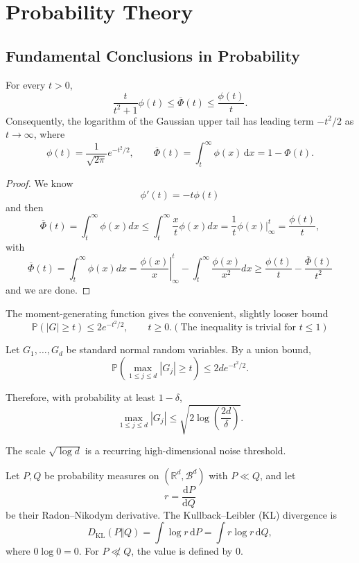 \section{Probability Theory}

\subsection{Fundamental Conclusions in Probability}

\begin{proposition}
For every $t>0$,
\[
\frac{t}{t^2+1}\phi(t)
\leq
\overline{\Phi}(t)
\leq
\frac{\phi(t)}{t}.
\]
Consequently, the logarithm of the Gaussian upper tail has leading term
$-t^2/2$ as $t\to\infty$, where
\[
\phi(t)=\frac{1}{\sqrt{2\pi}}e^{-t^2/2},
\qquad
\overline{\Phi}(t)
=\int_t^\infty \phi(x)\,\mathrm{d}x
=1-\Phi(t).
\]
\end{proposition}
\begin{proof}
    We know
    \[
    \phi'(t) = -t\phi(t)
    \]
    and then
    \[
    \overline{\Phi}(t) = \int_t^{\infty}\phi(x)dx \leq \int_t^{\infty} \dfrac{x}{t}\phi(x)dx = \dfrac{1}{t}\phi(x)|_{\infty}^{t} = \dfrac{\phi(t)}{t}, 
    \]
    with
    \[
     \overline{\Phi}(t) = \int_t^{\infty} \phi(x)dx  = \left.\dfrac{\phi(x)}{x}\right|^t_{\infty} - \int_t^{\infty} \dfrac{\phi(x)}{x^2}dx  \geq  \dfrac{\phi(t)}{t} - \dfrac{\overline{\Phi}(t)}{t^2}
    \]
    and we are done.
\end{proof}

\begin{corollary}
    The moment-generating function gives the convenient, slightly looser bound
\[
\mathbb{P}(|G|\ge t)
\le 2e^{-t^2/2},
\qquad t\ge 0. (\text{The inequality is trivial for }t\leq 1)
\]
\end{corollary}

\begin{corollary}
    Let $G_1,\ldots,G_d$ be standard normal random variables. By a union bound,
\[
\mathbb{P}\left(
    \max_{1\le j\le d}|G_j|\ge t
\right)
\le 2d e^{-t^2/2}.
\]

Therefore, with probability at least $1-\delta$,
\[
\max_{1\le j\le d}|G_j|
\le
\sqrt{2\log\left(\frac{2d}{\delta}\right)}.
\]

The scale $\sqrt{\log d}$ is a recurring high-dimensional noise threshold.
\end{corollary}


\begin{definition}[KL Divergence]
Let $P,Q$ be probability measures on $(\mathbb{R}^d,\mathcal{B}^d)$
with $P\ll Q$, and let
\[
r=\frac{\mathrm{d}P}{\mathrm{d}Q}
\]
be their Radon--Nikodym derivative. The Kullback--Leibler (KL) divergence is
\[
D_{\mathrm{KL}}(P\Vert Q)
=
\int \log r\,\mathrm{d}P
=
\int r\log r\,\mathrm{d}Q,
\]
where $0\log 0=0$. For $P\not\ll Q$, the value is defined by $0$.
\end{definition}

